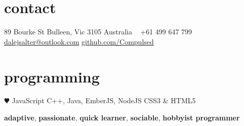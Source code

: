 \documentclass[]{friggeri-cv} %
\begin{document}

\begin{aside} %
\section{contact}
89 Bourke St
Bulleen, Vic 3105
Australia
~
+61 499 647 799
~
\href{mailto:dalejsalter@outlook.com}{dalejsalter@outlook.com}
\href{http://www.github.com/Compulsed/}{github.com/Compulsed}
\section{programming}
{\color{red} $\varheartsuit$} JavaScript
C++, Java, EmberJS, NodeJS
CSS3 \& HTML5
\end{aside}


\textbf{adaptive}, \textbf{passionate}, \textbf{quick learner}, \textbf{sociable}, \textbf{hobbyist programmer} \\ \\

\end{document}
